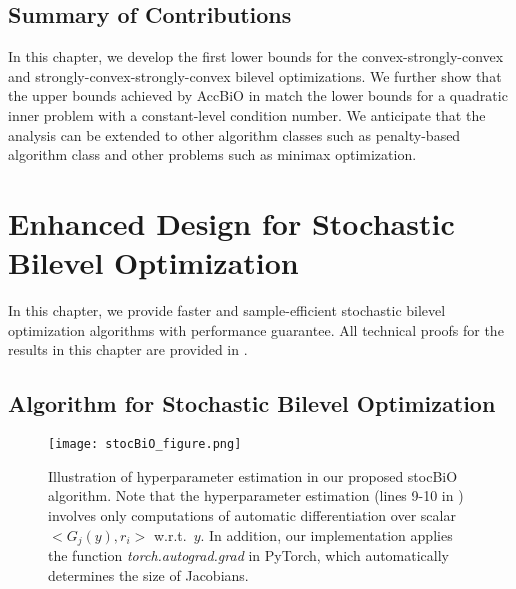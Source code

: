 \documentclass{osudissert96}
\begin{document}
\section{Summary of Contributions} 
In this chapter, we develop the first lower bounds for  the convex-strongly-convex and strongly-convex-strongly-convex  bilevel optimizations. We further show that the upper bounds achieved by AccBiO in  match the lower bounds for a quadratic inner problem with a constant-level condition number. We anticipate that the analysis can be extended to other algorithm classes such as penalty-based algorithm class and other problems such as minimax optimization.  

\chapter{Enhanced Design for Stochastic Bilevel Optimization}\label{chp:stoc_bilevel}
In this chapter,  we provide faster and sample-efficient stochastic bilevel optimization algorithms with performance guarantee. All technical proofs for the results in this chapter are provided in . 

\section{Algorithm for Stochastic Bilevel Optimization}
  \begin{figure*}[t]
	\centering  
	\texttt{[image: stocBiO\_figure.png]}
	\vspace{-0.2cm}
	\caption{Illustration of hyperparameter estimation in our proposed stocBiO algorithm. Note that the  hyperparameter estimation (lines 9-10 in ) involves only computations of automatic differentiation over scalar $<G_j(y),r_i>$ w.r.t.~$y$. In addition, our implementation applies the function {\em torch.autograd.grad} in PyTorch, which automatically determines the size of Jacobians. 
}\label{fig:stocBiO_illustrate}
\end{figure*}
\end{document}
